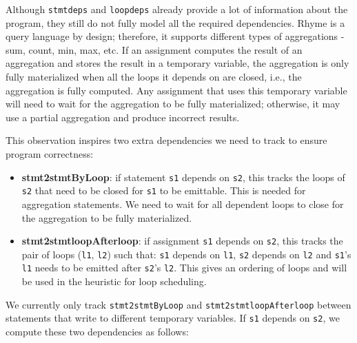 \documentclass[sigplan, nonacm]{acmart}\settopmatter{printfolios=true,printccs=false,printacmref=false}
\begin{document}
\fi
Although \texttt{stmtdeps} and \texttt{loopdeps} already provide a lot of information about the program, they still do not fully model all the required dependencies. Rhyme is a query language by design; therefore, it supports different types of aggregations - sum, count, min, max, etc. If an assignment computes the result of an aggregation and stores the result in a temporary variable, the aggregation is only fully materialized when all the loops it depends on are closed, i.e., the aggregation is fully computed. Any assignment that uses this temporary variable will need to wait for the aggregation to be fully materialized; otherwise, it may use a partial aggregation and produce incorrect results.\par
This observation inspires two extra dependencies we need to track to ensure program correctness:
\begin{itemize}
\item \textbf{stmt2stmtByLoop}: if statement \texttt{s1} depends on \texttt{s2}, this tracks the loops of \texttt{s2} that need to be closed for \texttt{s1} to be emittable. This is needed for aggregation statements. We need to wait for all dependent loops to close for the aggregation to be fully materialized.
\item \textbf{stmt2stmtloopAfterloop}: if assignment \texttt{s1} depends on \texttt{s2}, this tracks the pair of loops (\texttt{l1}, \texttt{l2}) such that: \texttt{s1} depends on \texttt{l1}, \texttt{s2} depends on \texttt{l2} and \texttt{s1}'s \texttt{l1} needs to be emitted after \texttt{s2}'s \texttt{l2}. This gives an ordering of loops and will be used in the heuristic for loop scheduling.
\end{itemize}
We currently only track \texttt{stmt2stmtByLoop} and \texttt{stmt2stmtloopAfterloop} between statements that write to different temporary variables. If \texttt{s1} depends on \texttt{s2}, we compute these two dependencies as follows:\par
\end{document}
